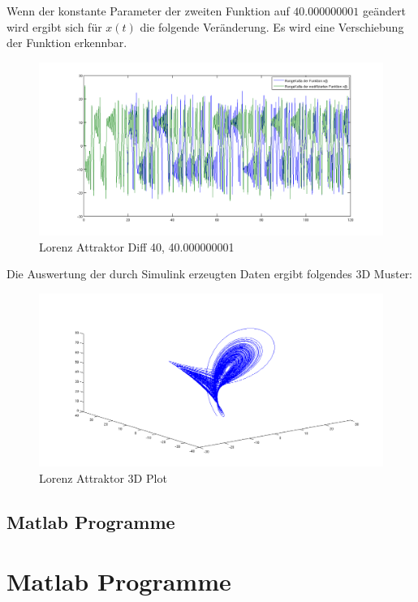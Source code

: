 \documentclass[10pt]{scrartcl}
\begin{document}
		Wenn der konstante Parameter der zweiten Funktion auf $40.000000001$ geändert wird ergibt sich für $x(t)$ die folgende Veränderung. Es wird eine Verschiebung der Funktion erkennbar.  
		
		\begin{figure}[H]
			\centering	
			\includegraphics[width=\textwidth]{lorenzdif.png}
            \caption{Lorenz Attraktor Diff 40, 40.000000001}
            \label{pic:diff}
		\end{figure} 
		
		Die Auswertung der durch Simulink erzeugten Daten ergibt folgendes 3D Muster:
		\begin{figure}[H]
			\centering	
			\includegraphics[width=\textwidth]{lorenz3d.png}
            \caption{Lorenz Attraktor 3D Plot}
            \label{pic:3dplot}
		\end{figure} 
		
\subsection{Matlab Programme}
	
			
			
		
		
	\section{Matlab Programme}	
	
		
			
		
\end{document}

